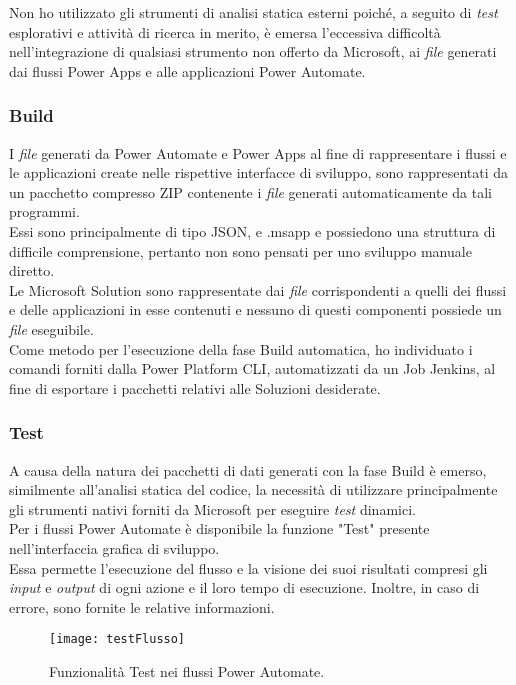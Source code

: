 \noindent Non ho utilizzato gli strumenti di analisi statica esterni poiché, a seguito di \emph{test} esplorativi e attività di ricerca in merito, è emersa l'eccessiva difficoltà nell'integrazione di qualsiasi strumento non offerto da Microsoft, ai \emph{file} generati dai flussi Power Apps e alle applicazioni Power Automate. 

\subsubsection*{Build}
I \emph{file} generati da Power Automate e Power Apps al fine di rappresentare i flussi e le applicazioni create nelle rispettive interfacce di sviluppo, sono rappresentati da un pacchetto compresso ZIP contenente i \emph{file} generati automaticamente da tali programmi.\\
Essi sono principalmente di tipo JSON, e .msapp e possiedono una struttura di difficile comprensione, pertanto non sono pensati per uno sviluppo manuale diretto.\\
Le Microsoft Solution sono rappresentate dai \emph{file} corrispondenti a quelli dei flussi e delle applicazioni in esse contenuti e nessuno di questi componenti possiede un \emph{file} eseguibile.\\
Come metodo per l'esecuzione della fase Build automatica, ho individuato i comandi forniti dalla Power Platform CLI, automatizzati da un Job Jenkins, al fine di esportare i pacchetti relativi alle Soluzioni desiderate. 

\subsubsection*{Test}
A causa della natura dei pacchetti di dati generati con la fase Build è emerso, similmente all'analisi statica del codice, la necessità di utilizzare principalmente gli strumenti nativi forniti da Microsoft per eseguire \emph{test} dinamici.\\
Per i flussi Power Automate è disponibile la funzione "Test" presente nell'interfaccia grafica di sviluppo.\\
Essa permette l'esecuzione del flusso e la visione dei suoi risultati compresi gli \emph{input} e \emph{output} di ogni azione e il loro tempo di esecuzione. 
Inoltre, in caso di errore, sono fornite le relative informazioni. 
\begin{figure}[htbp] 
    \centering 
    \texttt{[image: testFlusso]} 
    \caption{Funzionalità Test nei flussi Power Automate.}
    \label{fig:testFlusso}
\end{figure}

